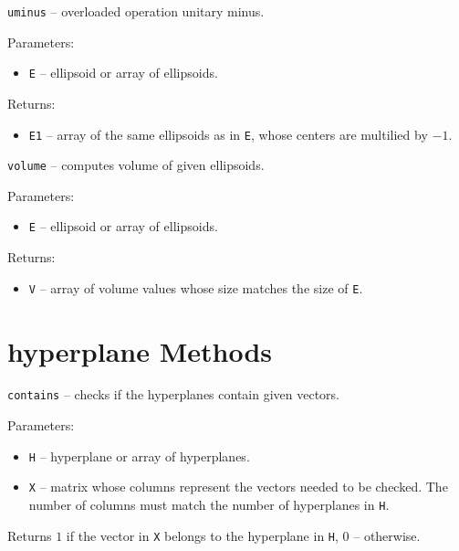 

\newpage


{\Large {\tt uminus}} -- overloaded operation unitary minus.

Parameters:
\begin{itemize}
\item {\tt E} -- ellipsoid or array of ellipsoids.
\end{itemize}

Returns:
\begin{itemize}
\item {\tt E1} -- array of the same ellipsoids as in {\tt E}, whose centers
are multilied by $-1$.
\end{itemize}



\newpage

{\Large {\tt volume}} -- computes volume of given ellipsoids.

Parameters:
\begin{itemize}
\item {\tt E} -- ellipsoid or array of ellipsoids.
\end{itemize}

Returns:
\begin{itemize}
\item {\tt V} -- array of volume values whose size matches the size of {\tt E}.
\end{itemize}


\newpage

\section{hyperplane Methods}
{\Large {\tt contains}} -- checks if the hyperplanes contain given vectors.

Parameters:
\begin{itemize}
\item {\tt H} -- hyperplane or array of hyperplanes.
\item {\tt X} -- matrix whose columns represent the vectors needed to be checked.
The number of columns must match the number of hyperplanes in {\tt H}.
\end{itemize}

Returns $1$ if the vector in {\tt X} belongs to the hyperplane in {\tt H},
$0$ -- otherwise.

